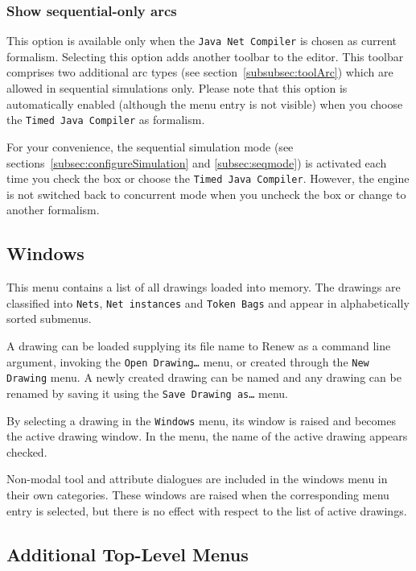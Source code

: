 \subsubsection{Show sequential-only arcs}
\label{subsec:sequentialTools}

This option is available only when the
\texttt{Java Net Compiler} is chosen as current formalism.
Selecting this option adds another toolbar to the editor.
This toolbar comprises two additional arc types (see
section~\ref{subsubsec:toolArc}) which are allowed in
sequential simulations only.
Please note that this option is automatically enabled (although
the menu entry is not visible) when you choose the
\texttt{Timed Java Compiler} as formalism.

For your convenience, the sequential simulation mode (see
sections~\ref{subsec:configureSimulation} and
\ref{subsec:seqmode}) is activated each time you check the box or
choose the \texttt{Timed Java Compiler}.
However, the engine is not switched back to concurrent mode when
you uncheck the box or change to another formalism.


\subsection{Windows}
\label{subsec:menuDrawings}

This menu contains a list of all drawings loaded into memory.
The drawings are classified into \texttt{Nets},
\texttt{Net instances} and \texttt{Token Bags} and appear in
alphabetically sorted submenus.

A drawing can be loaded supplying its file name to Renew as a
command line argument, invoking the \texttt{Open Drawing\dots{}}
menu, or created through the \texttt{New Drawing} menu.
A newly created drawing can be named and any drawing can be
renamed by saving it using the \texttt{Save Drawing as\dots{}} menu.

By selecting a drawing in the \texttt{Windows} menu, its window
is raised and becomes the active drawing window.
In the menu, the name of the active drawing appears checked.

Non-modal tool and attribute dialogues are included in the windows menu in
their own categories.
These windows are raised when the corresponding menu entry is selected,
but there is no effect with respect to the list of active drawings.

\subsection{Additional Top-Level Menus}
\label{sec:additional-top-level}

